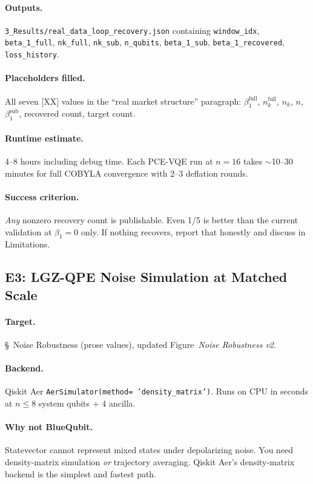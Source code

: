 \documentclass[11pt]{article}
\begin{document}
\paragraph*{Outputs.}
\texttt{3\_Results/real\_data\_loop\_recovery.json} containing
\texttt{window\_idx}, \texttt{beta\_1\_full}, \texttt{nk\_full},
\texttt{nk\_sub}, \texttt{n\_qubits}, \texttt{beta\_1\_sub},
\texttt{beta\_1\_recovered}, \texttt{loss\_history}.

\paragraph*{Placeholders filled.} All seven [XX] values in the
``real market structure'' paragraph:
$\beta_1^{\text{full}}$, $n_k^{\text{full}}$, $n_k$, $n$,
$\beta_1^{\text{sub}}$, recovered count, target count.

\paragraph*{Runtime estimate.} 4--8 hours including debug time. Each
PCE-VQE run at $n = 16$ takes $\sim$10--30 minutes for full COBYLA
convergence with 2--3 deflation rounds.

\paragraph*{Success criterion.} \emph{Any} nonzero recovery count is
publishable. Even 1/5 is better than the current validation at
$\beta_1 = 0$ only. If nothing recovers, report that honestly and
discuss in Limitations.

\subsection{E3: LGZ-QPE Noise Simulation at Matched Scale}

\paragraph*{Target.} \S~Noise Robustness (prose values), updated
Figure~\emph{Noise Robustness v2}.

\paragraph*{Backend.} Qiskit Aer \texttt{AerSimulator(method=
'density\_matrix')}. Runs on CPU in seconds at $n \leq 8$ system
qubits + 4 ancilla.

\paragraph*{Why not BlueQubit.} Statevector cannot represent mixed
states under depolarizing noise. You need density-matrix simulation
\emph{or} trajectory averaging. Qiskit Aer's density-matrix backend
is the simplest and fastest path.
\end{document}

